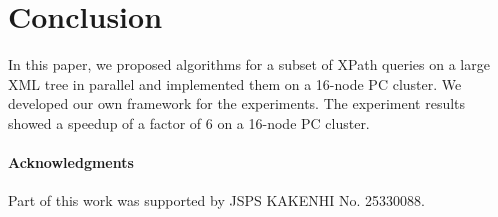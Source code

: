 \section{Conclusion}

In this paper, we proposed algorithms for a subset of 
XPath queries on a large XML tree in parallel and 
implemented them on a 16-node PC cluster. 
We developed our own framework for the experiments. The 
experiment results showed a speedup of a factor of 6 on a 16-node PC cluster. 

\paragraph*{Acknowledgments}
Part of this work was supported by JSPS KAKENHI No. 25330088.
